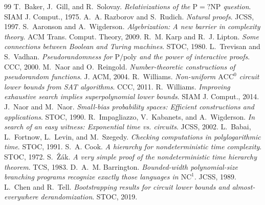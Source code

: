 \documentclass[11pt,a4paper]{article}
\theoremstyle{definition}
\theoremstyle{remark}
\begin{document}
\begin{thebibliography}{99}
 T.~Baker, J.~Gill, and R.~Solovay. \emph{Relativizations of the $\mathrm{P}=?\mathrm{NP}$ question}. SIAM J. Comput., 1975.
 A.~A. Razborov and S.~Rudich. \emph{Natural proofs}. JCSS, 1997.
 S.~Aaronson and A.~Wigderson. \emph{Algebrization: A new barrier in complexity theory}. ACM Trans. Comput. Theory, 2009.
 R.~M. Karp and R.~J. Lipton. \emph{Some connections between Boolean and Turing machines}. STOC, 1980.
 L.~Trevisan and S.~Vadhan. \emph{Pseudorandomness for $\mathrm{P/poly}$ and the power of interactive proofs}. CCC, 2000.
 M.~Naor and O.~Reingold. \emph{Number-theoretic constructions of pseudorandom functions}. J. ACM, 2004.
 R.~Williams. \emph{Non-uniform $\mathrm{ACC}^0$ circuit lower bounds from SAT algorithms}. CCC, 2011.
 R.~Williams. \emph{Improving exhaustive search implies superpolynomial lower bounds}. SIAM J. Comput., 2014.
 J.~Naor and M.~Naor. \emph{Small-bias probability spaces: Efficient constructions and applications}. STOC, 1990.
 R.~Impagliazzo, V.~Kabanets, and A.~Wigderson. \emph{In search of an easy witness: Exponential time vs. circuits}. JCSS, 2002.
 L.~Babai, L.~Fortnow, L.~Levin, and M.~Szegedy. \emph{Checking computations in polylogarithmic time}. STOC, 1991.
 S.~A. Cook. \emph{A hierarchy for nondeterministic time complexity}. STOC, 1972.
 S.~\v{Z}\'ak. \emph{A very simple proof of the nondeterministic time hierarchy theorem}. TCS, 1983.
 D.~A.~M. Barrington. \emph{Bounded-width polynomial-size branching programs recognize exactly those languages in $\mathrm{NC}^1$}. JCSS, 1989.
 L.~Chen and R.~Tell. \emph{Bootstrapping results for circuit lower bounds and almost-everywhere derandomization}. STOC, 2019.
\end{thebibliography}
\end{document}
